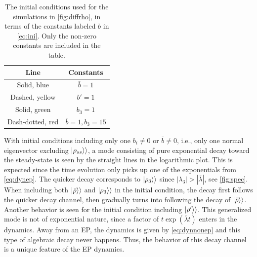 \documentclass[../main.tex]{subfiles}
\begin{document}
\begin{table}[H]
    \centering
    \caption{The initial conditions used for the simulations in \cref{fig:diffrho}, in terms of the constants labeled $b$ in \cref{eq:ini}. Only the non-zero constants are included in the table.}
    \begin{tabular}{c|c}\label{table:tab}
        Line & Constants \\\hline 
        Solid, blue & $\bar b = 1$ \\
        Dashed, yellow & $b'=1$ \\
        Solid, green & $b_3 = 1$ \\
        Dash-dotted, red & $\bar b = 1, b_3 = 15$ \\
    \end{tabular}
\end{table}
With initial conditions including only one $b_i\neq0$ or $\bar b\neq0$, i.e., only one normal eigenvector excluding $\ket{\rho_{ss}}\rangle$, a mode consisting of pure exponential decay toward the steady-state is seen by the straight lines in the logarithmic plot. This is expected since the time evolution only picks up one of the exponentials from \cref{eq:dynep}. The quicker decay corresponds to $\ket{\rho_3}\rangle$ since $|\lambda_3| > |\bar\lambda|$, see \cref{fig:spec}. When including both $\ket{\bar \rho}\rangle$ and $\ket{\rho_3}\rangle$ in the initial condition, the decay first follows the quicker decay channel, then gradually turns into following the decay of $\ket{\bar\rho}\rangle$. Another behavior is seen for the initial condition including $\ket{\rho'}\rangle$. This generalized mode is not of exponential nature, since a factor of $t\exp(\bar\lambda t)$ enters in the dynamics. Away from an EP, the dynamics is given by \cref{eq:dynnonep} and this type of algebraic decay never happens. Thus, the behavior of this decay channel is a unique feature of the EP dynamics.
\end{document}
